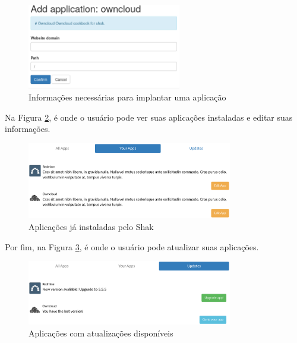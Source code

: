 \begin{figure}[h]
  \centering
  \includegraphics[width=0.6\textwidth]
      {figuras/shakx}
      \caption{Informações necessárias para implantar uma aplicação}
  \label{fig:shakxx}
\end{figure}

Na Figura \ref{fig:shakx2}, é onde o usuário pode ver suas aplicações instaladas e editar
suas informações.

\begin{figure}[H]
  \centering
  \includegraphics[width=0.8\textwidth]
      {figuras/shak2}
      \caption{Aplicações já instaladas pelo Shak}
    \label{fig:shakx2}
\end{figure}

Por fim, na Figura \ref{fig:shakx3}, é onde o usuário pode atualizar suas aplicações.

\begin{figure}[H]
  \centering
  \includegraphics[width=0.8\textwidth]
      {figuras/shak3}
      \caption{Aplicações com atualizações disponíveis}
  \label{fig:shakx3}
\end{figure}

